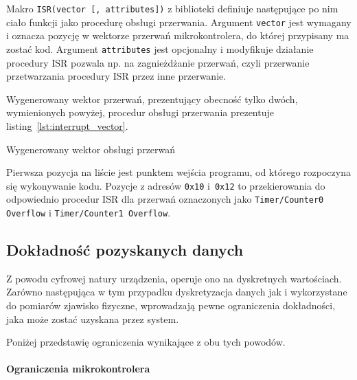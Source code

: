 Makro \texttt{ISR(vector [, attributes])} z biblioteki  definiuje następujące po nim ciało funkcji jako procedurę obsługi przerwania. Argument \texttt{vector} jest wymagany i oznacza pozycję w wektorze przerwań mikrokontrolera, do której przypisany ma zostać kod. Argument \texttt{attributes} jest opcjonalny i modyfikuje działanie procedury ISR \ppauza pozwala np. na zagnieżdżanie przerwań, czyli przerwanie przetwarzania procedury ISR przez inne przerwanie.

Wygenerowany wektor przerwań, prezentujący obecność tylko dwóch, wymienionych powyżej, procedur obsługi przerwania prezentuje listing~\ref{lst:interrupt_vector}.

\begin{listing}
  
  \caption[Wektor obsługi przerwań]{Wygenerowany wektor obsługi przerwań}
  \label{lst:interrupt_vector}
\end{listing}

Pierwsza pozycja na liście jest punktem wejścia programu, od którego rozpoczyna się wykonywanie kodu. Pozycje z adresów \texttt{0x10} i~\texttt{0x12} to przekierowania do odpowiednio procedur ISR dla przerwań oznaczonych jako \texttt{Timer/Counter0 Overflow} i \texttt{Timer/Counter1 Overflow}.

\subsection{Dokładność pozyskanych danych}\label{section:precision}
Z powodu cyfrowej natury urządzenia, operuje ono na dyskretnych wartościach. Zarówno następująca w tym przypadku dyskretyzacja danych jak i wykorzystane do pomiarów zjawisko fizyczne, wprowadzają pewne ograniczenia dokładności, jaka może zostać uzyskana przez system.

Poniżej przedstawię ograniczenia wynikające z obu tych powodów.

\paragraph{Ograniczenia mikrokontrolera}
\label{section:microcontroller_limit}

